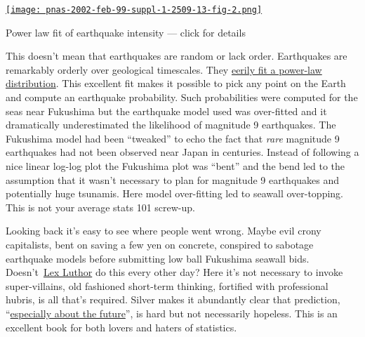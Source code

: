 \begin{floatingfigure}[r]{0.38\textwidth}
\centering
\href{http://www.pnas.org/content/99/suppl.1/2509.full}{\texttt{[image: pnas-2002-feb-99-suppl-1-2509-13-fig-2.png]}}
\caption{Power law fit of earthquake intensity --- click for details}
\label{fig:3901X2}
\end{floatingfigure} This doesn't mean that earthquakes are random or lack order. Earthquakes
are remarkably orderly over geological timescales. They
\href{http://www.pnas.org/content/99/suppl.1/2509.full}{eerily fit a
power-law distribution}. This excellent fit makes it possible to pick
any point on the Earth and compute an earthquake probability. Such
probabilities were computed for the seas near Fukushima but the
earthquake model used was over-fitted and it dramatically underestimated
the likelihood of magnitude 9 earthquakes. The Fukushima model
had been ``tweaked'' to echo the fact that \emph{rare} magnitude 9
earthquakes had not been observed near Japan in
centuries.  Instead of following a nice linear log-log plot the
Fukushima plot was ``bent'' and the bend led to the assumption that
it wasn't necessary to plan for magnitude 9 earthquakes and potentially
huge tsunamis. Here model over-fitting led to seawall over-topping.
This is not your average stats 101 screw-up.

Looking back it's easy to see where people went wrong. Maybe evil crony
capitalists, bent on saving a few yen on concrete, conspired to sabotage
earthquake models before submitting low ball Fukushima seawall
bids. Doesn't~\href{http://dc.wikia.com/wiki/Lex\_Luthor}{Lex Luthor} do
this every other day? Here it's not necessary to invoke super-villains,
old fashioned short-term thinking, fortified with professional hubris, is
all that's required. Silver makes it abundantly clear that prediction,
``\href{http://www.larry.denenberg.com/predictions.html}{especially
about the future}'', is hard but not necessarily hopeless. This is an
excellent book for both lovers and haters of statistics.


